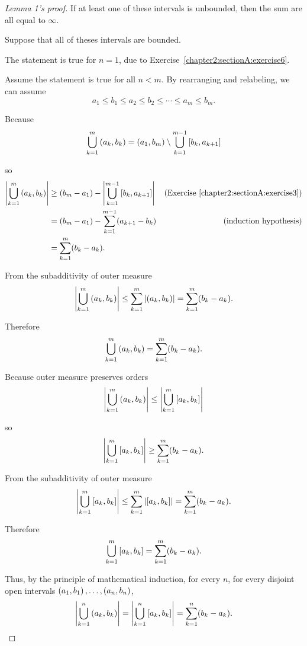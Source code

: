 \begin{proof}[Lemma 1's proof]
    If at least one of these intervals is unbounded, then the sum are all equal to $\infty$.

    Suppose that all of theses intervals are bounded.

    The statement is true for $n = 1$, due to Exercise~\ref{chapter2:sectionA:exercise6}.

    Assume the statement is true for all $n < m$. By rearranging and relabeling, we can assume
    \[
        a_{1}\leq b_{1} \leq a_{2}\leq b_{2}\leq \cdots \leq a_{m}\leq b_{m}.
    \]

    Because
    \begin{align*}
        \bigcup^{m}_{k=1}\left({a_{k}, b_{k}}\right) = \left({a_{1}, b_{m}}\right)\setminus \bigcup^{m-1}_{k=1}\left[{b_{k}, a_{k+1}}\right]
    \end{align*}

    so
    \begin{align*}
        \left\vert{\bigcup^{m}_{k=1}\left({a_{k}, b_{k}}\right)}\right\vert & \geq (b_{m} - a_{1}) - \left\vert{\bigcup^{m-1}_{k=1}\left[{b_{k}, a_{k+1}}\right]}\right\vert & \text{(Exercise~\ref{chapter2:sectionA:exercise3})} \\
                                                           & = (b_{m} - a_{1}) - \sum^{m-1}_{k=1}(a_{k+1} - b_{k})                           & \text{(induction hypothesis)}                       \\
                                                           & = \sum^{m}_{k=1}(b_{k} - a_{k}).
    \end{align*}

    From the subadditivity of outer measure
    \[
        \left\vert{\bigcup^{m}_{k=1}\left({a_{k}, b_{k}}\right)}\right\vert \leq \sum^{m}_{k=1}\left\vert{\left({a_{k}, b_{k}}\right)}\right\vert = \sum^{m}_{k=1}(b_{k} - a_{k}).
    \]

    Therefore
    \[
        \bigcup^{m}_{k=1}\left({a_{k}, b_{k}}\right) = \sum^{m}_{k=1}(b_{k} - a_{k}).
    \]

    Because outer measure preserves orders
    \[
        \left\vert{\bigcup^{m}_{k=1}\left({a_{k}, b_{k}}\right)}\right\vert \leq \left\vert{\bigcup^{m}_{k=1}\left[{a_{k}, b_{k}}\right]}\right\vert
    \]

    so
    \[
        \left\vert{\bigcup^{m}_{k=1}\left[{a_{k}, b_{k}}\right]}\right\vert \geq \sum^{m}_{k=1}(b_{k} - a_{k}).
    \]

    From the subadditivity of outer measure
    \[
        \left\vert{\bigcup^{m}_{k=1}\left[{a_{k}, b_{k}}\right]}\right\vert \leq \sum^{m}_{k=1}\left\vert{\left[{a_{k}, b_{k}}\right]}\right\vert = \sum^{m}_{k=1}(b_{k} - a_{k}).
    \]

    Therefore
    \[
        \bigcup^{m}_{k=1}\left[{a_{k}, b_{k}}\right] = \sum^{m}_{k=1}(b_{k} - a_{k}).
    \]

    Thus, by the principle of mathematical induction, for every $n$, for every disjoint open intervals $\left({a_{1}, b_{1}}\right), \ldots, \left({a_{n}, b_{n}}\right)$,
    \[
        \left\vert{\bigcup^{n}_{k=1}\left({a_{k}, b_{k}}\right)}\right\vert = \left\vert{\bigcup^{n}_{k=1}\left[{a_{k}, b_{k}}\right]}\right\vert = \sum^{n}_{k=1}(b_{k} - a_{k}).
    \]
\end{proof}


